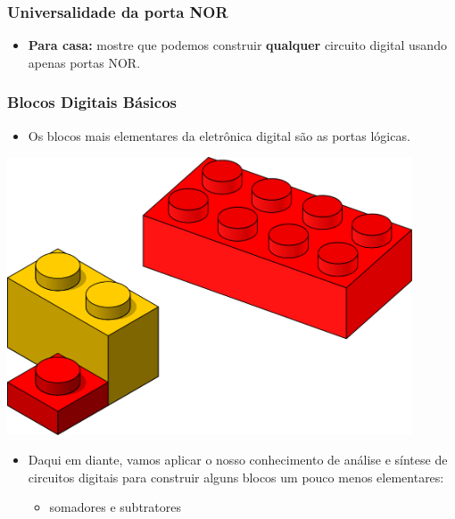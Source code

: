 \documentclass{beamer}
\begin{document}
\begin{frame}
\frametitle{Universalidade da porta NOR}

\begin{itemize}
\item \textbf{Para casa: } mostre que podemos construir \textbf{qualquer}
circuito digital usando apenas portas NOR.
\end{itemize}

\end{frame}

\begin{frame}
\frametitle{Blocos Digitais Básicos}

\begin{minipage}{0.7\textwidth}
\begin{itemize}
\item Os blocos mais elementares da eletrônica digital são as
portas lógicas.
\end{itemize}
\end{minipage}
\begin{minipage}{0.27\textwidth}
\includegraphics[width=0.9\textwidth]{images/bricks}
\end{minipage}
\pause
\begin{itemize}
\item Daqui em diante, vamos aplicar o nosso conhecimento de
análise e síntese de circuitos digitais para construir alguns
blocos um pouco menos elementares:
\pause
\begin{itemize}
\item somadores e subtratores

\end{itemize}
\end{itemize}
\end{frame}
\end{document}
